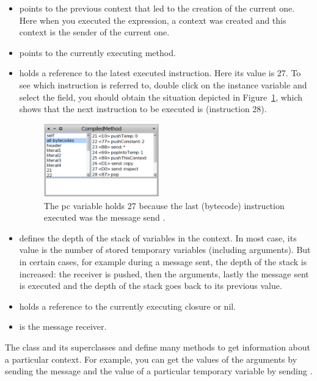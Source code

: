 \documentclass[a4paper,10pt,twoside]{book}
\begin{document}
\begin{itemize}
\item {} points to the previous context that led to the creation of the current one. Here when you executed the expression, a context was created and this context is the sender of the current one.

\item {} points to the currently executing method.

\item {} holds a reference to the latest executed instruction. Here its value is 27. To see which instruction is referred to, double click on the  instance variable and select the  field, you should obtain the situation depicted in Figure~\ref{ByteCodes}, which shows that the next instruction to be executed is  (instruction 28).

\begin{figure}[b]
  \begin{center}\includegraphics[width=5cm]{ByteCodes}
    \caption{The pc variable holds 27 because the last (bytecode) instruction executed was the message send .\label{ByteCodes}}
  \end{center}
\end{figure}

\item {} defines the depth of the stack of variables in the context. In most case, its value is the number of stored temporary variables (including arguments). But in certain cases, for example during a message sent, the depth of the stack is increased: the receiver is pushed, then the arguments, lastly the message sent is executed and the depth of the stack goes back to its previous value.

\item {} holds a reference to the currently executing closure or nil.

\item {} is the message receiver.
\end{itemize}

The class  and its superclasses  and  define many methods to get information about a particular context. For example, you can get the values of the arguments by sending the  message and the value of a particular temporary variable by sending .
\end{document}
